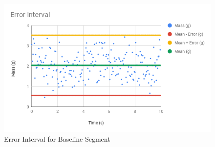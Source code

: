 \begin{figure} \label{figure.baseline.interval}
    \centering
    \includegraphics[scale=0.71]{image/00-intro/baseline-error-interval.png}
    \caption{Error Interval for Baseline Segment}
\end{figure}
